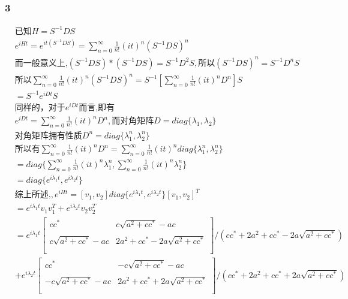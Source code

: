 \documentclass[UTF8,a4paper,10pt]{ctexart}
\begin{document}
  \subsubsection{3}
  \begin{equation}
      \begin{aligned}
          &\text{已知}H=S^{-1}DS\\
          &e^{iHt}=e^{it(S^{-1}DS)}=\sum_{n=0}^{\infty}\frac{1}{n!}(it)^{n}(S^{-1}DS)^n\\
          &\text{而一般意义上,}(S^{-1}DS)*(S^{-1}DS)=S^{-1}D^2S,\text{所以}(S^{-1}DS)^n=S^{-1}D^nS\\
          &\text{所以}\sum_{n=0}^{\infty}\frac{1}{n!}(it)^{n}(S^{-1}DS)^n=S^{-1}[\sum_{n=0}^{\infty}\frac{1}{n!}(it)^{n}D^n]S\\
          &=S^{-1}e^{iDt}S\\
          &\text{同样的，对于}e^{iDt}\text{而言,即有}\\
          &e^{iDt}=\sum_{n=0}^{\infty}\frac{1}{n!}(it)^{n}D^n,\text{而对角矩阵}D=\textit{diag}\{\lambda_{1},\lambda_{2}\}\\
          &\text{对角矩阵拥有性质}D^n=\textit{diag}\{\lambda_{1}^n,\lambda_{2}^n\}\\
          &\text{所以有}\sum_{n=0}^{\infty}\frac{1}{n!}(it)^{n}D^n=\sum_{n=0}^{\infty}\frac{1}{n!}(it)^{n}\textit{diag}\{\lambda_{1}^n,\lambda_{2}^n\}\\
          &=\textit{diag}\{\sum_{n=0}^{\infty}\frac{1}{n!}(it)^{n}\lambda_{1}^n,\sum_{n=0}^{\infty}\frac{1}{n!}(it)^{n}\lambda_{2}^n\}\\
          &=\textit{diag}\{e^{i\lambda_{1}t},e^{i\lambda_{2}t}\}\\
          &\text{综上所述,},e^{iHt}=[v_{1},v_{2}]\textit{diag}\{e^{i\lambda_{1}t},e^{i\lambda_{2}t}\}[v_{1},v_{2}]^{T}\\
          &=e^{i\lambda_{1}t}v_{1}v_{1}^{T}+e^{i\lambda_{2}t}v_{2}v_{2}^{T}\\
          &=e^{i\lambda_{1}t}\left[
            \begin{array}{cc}
            cc^{*} &c\sqrt{a^2+cc^{*}}-ac \\\\
            c\sqrt{a^2+cc^{*}}-ac & 2a^2+cc^{*}-2a\sqrt{a^2+cc^{*}} \\\\
            \end{array}
      \right]/(cc^{*}+2a^2+cc^{*}-2a\sqrt{a^2+cc^{*}})\\
      &+e^{i\lambda_{2}t}\left[
        \begin{array}{cc}
        cc^{*} & -c\sqrt{a^2+cc^{*}}-ac\\\\
        -c\sqrt{a^2+cc^{*}}-ac & 2a^2+cc^{*}+2a\sqrt{a^2+cc^{*}} \\\\
        \end{array}
  \right]/(cc^{*}+2a^2+cc^{*}+2a\sqrt{a^2+cc^{*}})
      \end{aligned}
  \end{equation}
\end{document}
